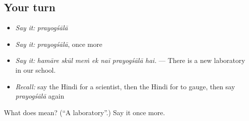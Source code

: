 \subsection*{Your turn}
\begin{itemize}
\raggedright
  \item \emph{Say it:} \emph{prayogśālā}
  \item \emph{Say it:} \emph{prayogśālā}, once more
  \item \emph{Say it:} \emph{hamāre skūl meṁ ek naī prayogśālā hai.} — There is a new laboratory in our school.
  \item \emph{Recall:} say the Hindi for a scientist, then the Hindi for to gauge, then say \emph{prayogśālā} again
\end{itemize}

\begin{tcolorbox}[breakable,colback=teal!4,colframe=teal!35!black,title={Before you move on}]
What does  mean? (\textquotedblleft{}A laboratory\textquotedblright{}.) Say it once more.
\end{tcolorbox}
